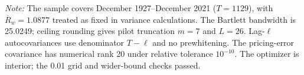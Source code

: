 \begin{table}[H]
\begin{minipage}{0.98\textwidth}
    \par\smallskip
    {\footnotesize\raggedright \textit{Note:} The sample covers December 1927--December 2021 ($T=1129$), with $\overline{R}_w=1.0877$ treated as fixed in variance calculations. The Bartlett bandwidth is 25.0249; ceiling rounding gives pilot truncation $m=7$ and $L=26$. Lag-$\ell$ autocovariances use denominator $T-\ell$ and no prewhitening. The pricing-error covariance has numerical rank 20 under relative tolerance $10^{-10}$. The optimizer is interior; the 0.01 grid and wider-bound checks passed.\par}
  \end{minipage}
\end{table}
